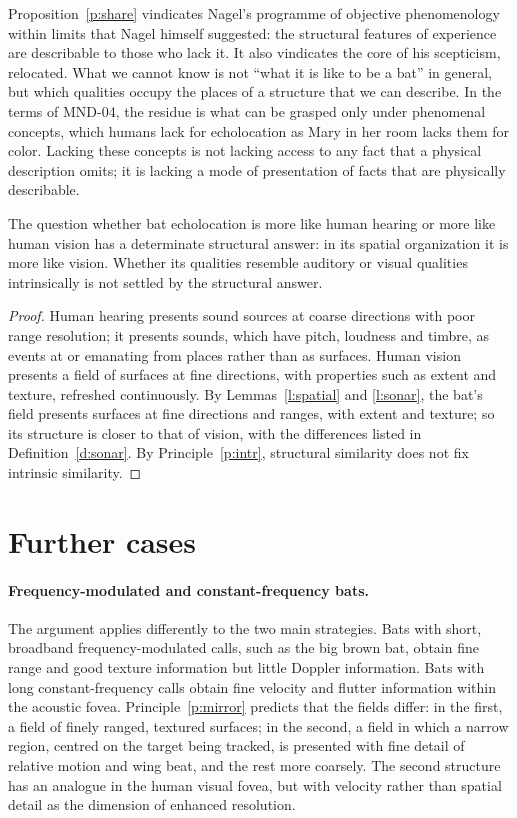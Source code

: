 \documentclass{situationist-preprint}
\begin{document}
Proposition~\ref{p:share} vindicates Nagel's programme of objective phenomenology within limits that Nagel himself suggested: the structural features of experience are describable to those who lack it. It also vindicates the core of his scepticism, relocated. What we cannot know is not \enquote{what it is like to be a bat} in general, but which qualities occupy the places of a structure that we can describe. In the terms of MND-04, the residue is what can be grasped only under phenomenal concepts, which humans lack for echolocation as Mary in her room lacks them for color. Lacking these concepts is not lacking access to any fact that a physical description omits; it is lacking a mode of presentation of facts that are physically describable.

\begin{corollary}\label{c:comparison}
The question whether bat echolocation is more like human hearing or more like human vision has a determinate structural answer: in its spatial organization it is more like vision. Whether its qualities resemble auditory or visual qualities intrinsically is not settled by the structural answer.
\end{corollary}

\begin{proof}
Human hearing presents sound sources at coarse directions with poor range resolution; it presents sounds, which have pitch, loudness and timbre, as events at or emanating from places rather than as surfaces. Human vision presents a field of surfaces at fine directions, with properties such as extent and texture, refreshed continuously. By Lemmas~\ref{l:spatial} and \ref{l:sonar}, the bat's field presents surfaces at fine directions and ranges, with extent and texture; so its structure is closer to that of vision, with the differences listed in Definition~\ref{d:sonar}. By Principle~\ref{p:intr}, structural similarity does not fix intrinsic similarity.
\end{proof}

\section{Further cases}\label{s:cases}

\paragraph{Frequency-modulated and constant-frequency bats.} The argument applies differently to the two main strategies. Bats with short, broadband frequency-modulated calls, such as the big brown bat, obtain fine range and good texture information but little Doppler information. Bats with long constant-frequency calls obtain fine velocity and flutter information within the acoustic fovea. Principle~\ref{p:mirror} predicts that the fields differ: in the first, a field of finely ranged, textured surfaces; in the second, a field in which a narrow region, centred on the target being tracked, is presented with fine detail of relative motion and wing beat, and the rest more coarsely. The second structure has an analogue in the human visual fovea, but with velocity rather than spatial detail as the dimension of enhanced resolution.
\end{document}
